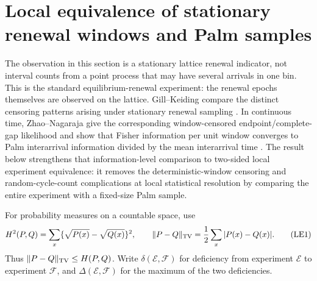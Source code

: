 \section{Local equivalence of stationary renewal windows and Palm samples}
\label{sec:renewal-equivalence-main}

The observation in this section is a stationary lattice renewal indicator,
not interval counts from a point process that may have several arrivals in
one bin.  This is the standard equilibrium-renewal experiment: the renewal
epochs themselves are observed on the lattice.  Gill--Keiding compare the
distinct censoring patterns arising under stationary renewal sampling
\cite{GillKeiding2010RenewalSampling}.  In continuous time,
Zhao--Nagaraja give the corresponding window-censored endpoint/complete-gap
likelihood and show that Fisher information per unit window converges to Palm
interarrival information divided by the mean interarrival time
\cite{ZhaoNagaraja2011WindowCensoredRenewal}.  The result below strengthens
that information-level comparison to two-sided local experiment equivalence:
it removes the
deterministic-window censoring and random-cycle-count complications at local
statistical resolution by comparing the entire experiment with a fixed-size
Palm sample.

For probability measures on a countable space, use
\[
 H^2(P,Q)=\sum_x\{\sqrt{P(x)}-\sqrt{Q(x)}\}^2,
 \qquad \|P-Q\|_{\rm TV}=\frac12\sum_x|P(x)-Q(x)|.
\tag{LE1}\label{eq:le1-main}
\]
Thus \(\|P-Q\|_{\rm TV}\le H(P,Q)\).  Write
\(\delta(\mathcal E,\mathcal F)\) for deficiency from experiment
\(\mathcal E\) to experiment \(\mathcal F\), and
\(\Delta(\mathcal E,\mathcal F)\) for the maximum of the two deficiencies.


